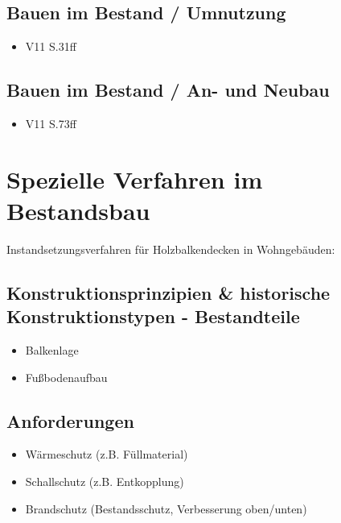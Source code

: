 \documentclass[fleqn,twoside,dvipsnames]{article}
\begin{document}
    \subsection{Bauen im Bestand / Umnutzung}
        \begin{itemize}
            \item V11 S.31ff
        \end{itemize}

    \subsection{Bauen im Bestand / An- und Neubau}
        \begin{itemize}
            \item V11 S.73ff
        \end{itemize}

\newpage

\section{Spezielle Verfahren im Bestandsbau}
    Instandsetzungsverfahren für Holzbalkendecken in Wohngebäuden:
    
    \subsection{Konstruktionsprinzipien \& historische Konstruktionstypen - Bestandteile}
                \begin{itemize}
                    \item Balkenlage
                    \item Fußbodenaufbau
                \end{itemize}
     \subsection{Anforderungen}
                \begin{itemize}
                    \item Wärmeschutz (z.B. Füllmaterial)
                    \item Schallschutz (z.B. Entkopplung)
                    \item Brandschutz (Bestandsschutz, Verbesserung oben/unten)
                \end{itemize}
\end{document}
